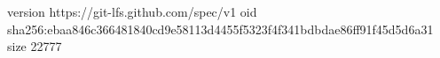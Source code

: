 version https://git-lfs.github.com/spec/v1
oid sha256:ebaa846c366481840cd9e58113d4455f5323f4f341bdbdae86ff91f45d5d6a31
size 22777
